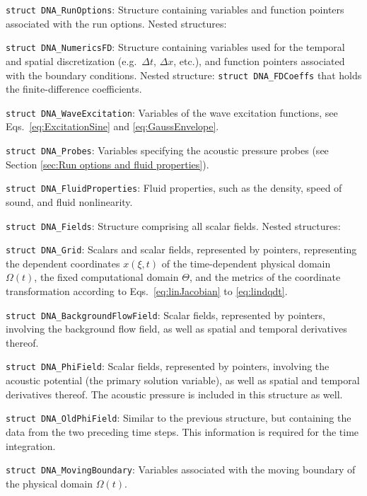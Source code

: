 \begin{compactitem}
\item {\tt struct DNA\_RunOptions}: Structure containing variables and function pointers associated with the run options. Nested structures:
\begin{compactitem}
\item {\tt struct DNA\_NumericsFD}: Structure containing variables used for the temporal and spatial discretization (e.g.~$\Delta t$, $\Delta x$, etc.), and function pointers associated with the boundary conditions. Nested structure: {\tt struct DNA\_FDCoeffs} that holds the finite-difference coefficients.
\item {\tt struct DNA\_WaveExcitation}: Variables of the wave excitation functions, see Eqs.~\eqref{eq:ExcitationSine} and \eqref{eq:GaussEnvelope}.
\item {\tt struct DNA\_Probes}: Variables specifying the acoustic pressure probes (see Section \ref{sec:Run options and fluid properties}).
\end{compactitem}
\item {\tt struct DNA\_FluidProperties}: Fluid properties, such as the density, speed of sound, and fluid nonlinearity.
\item {\tt struct DNA\_Fields}: Structure comprising all scalar fields. Nested structures:
\begin{compactitem}
\item {\tt struct DNA\_Grid}: Scalars and scalar fields, represented by pointers, representing the dependent coordinates $x\left(\xi,t\right)$ of the time-dependent physical domain $\Omega\left(t\right)$, the fixed computational domain $\Theta$, and the metrics of the coordinate transformation according to Eqs.~\eqref{eq:linJacobian} to \eqref{eq:lindqdt}.
\item {\tt struct DNA\_BackgroundFlowField}: Scalar fields, represented by pointers, involving the background flow field, as well as spatial and temporal derivatives thereof.
\item {\tt struct DNA\_PhiField}: Scalar fields, represented by pointers, involving the acoustic potential (the primary solution variable), as well as spatial and temporal derivatives thereof. The acoustic pressure is included in this structure as well.
\item {\tt struct DNA\_OldPhiField}: Similar to the previous structure, but containing the data from the two preceding time steps. This information is required for the time integration.
\end{compactitem}
\item {\tt struct DNA\_MovingBoundary}: Variables associated with the moving boundary of the physical domain $\Omega\left(t\right)$.
\end{compactitem}



